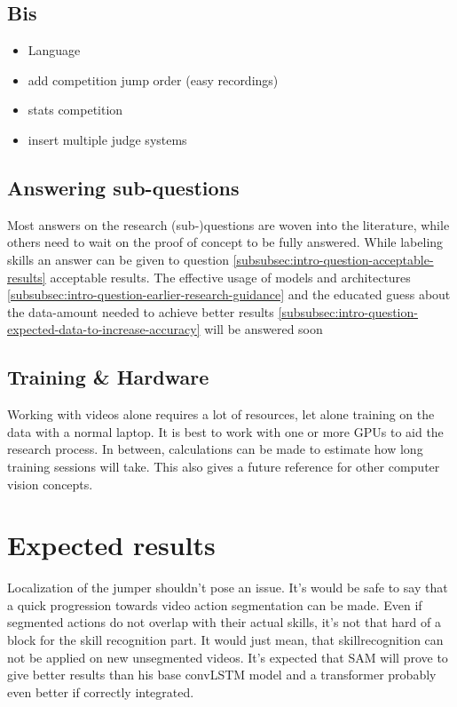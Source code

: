 \subsection{Bis}

\begin{itemize}
    \item Language
    \item add competition jump order (easy recordings)
    \item stats competition
    \item insert multiple judge systems
\end{itemize}



\subsection{Answering sub-questions}
\label{subsec:methodology-sub-questions}



Most answers on the research (sub-)questions are woven into the literature, while others need to wait on the proof of concept to be fully answered.
While labeling skills an answer can be given to question \ref{subsubsec:intro-question-acceptable-results} acceptable results. The effective usage of models and architectures \ref{subsubsec:intro-question-earlier-research-guidance} and the educated guess about the data-amount needed to achieve better results \ref{subsubsec:intro-question-expected-data-to-increase-accuracy} will be answered soon


\subsection{Training \& Hardware}

Working with videos alone requires a lot of resources, let alone training on the data with a normal laptop. It is best to work with one or more GPUs to aid the research process. In between, calculations can be made to estimate how long training sessions will take. This also gives a future reference for other computer vision concepts.


\section{Expected results}
\label{sec:verwachte-resultaten}

Localization of the jumper shouldn't pose an issue. It's would be safe to say that a quick progression towards video action segmentation can be made. Even if segmented actions do not overlap with their actual skills, it's not that hard of a block for the skill recognition part. It would just mean, that skillrecognition can not be applied on new unsegmented videos.
It's expected that SAM will prove to give better results than his base convLSTM model and a transformer probably even better if correctly integrated.

